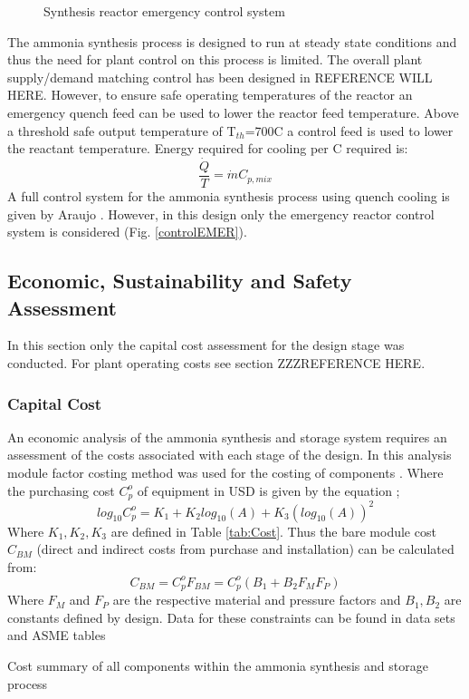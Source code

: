 \documentclass[11pt, a4paper]{article}
\begin{document}
{\begin{figure}
		\caption{Synthesis reactor emergency control system \label{fig:controlEMER}}
\end{figure}
The ammonia synthesis process is designed to run at steady state conditions and thus the need for plant control on this process is limited. The overall plant supply/demand matching control has been designed in REFERENCE WILL HERE. However, to ensure safe operating temperatures of the reactor an emergency quench feed can be used to lower the reactor feed temperature. Above a threshold safe output temperature of T$_{th}$=700\textdegree C a control feed is used to lower the reactant temperature. Energy required for cooling per \textdegree C required is:
\begin{equation}
\frac{\dot{Q}}{T} = \dot{m}C_{p,mix}
\end{equation}
A full control system for the ammonia synthesis process using quench cooling is given by Araujo \cite{Araujo2008}. However, in this design only the emergency reactor control system is considered (Fig. \ref{controlEMER}). 


\subsection{Economic, Sustainability and Safety Assessment}

In this section only the capital cost assessment for the design stage was conducted. For plant operating costs see section ZZZREFERENCE HERE.
\subsubsection{Capital Cost}
An economic analysis of the ammonia synthesis and storage system requires an assessment of the costs associated with each stage of the design. In this analysis module factor costing method was used for the costing of components \cite{RichardTurtonRichardC.BailieWallaceB.Whiting2013}. Where the purchasing cost $C_p^o$ of equipment in USD is given by the equation \cite{Banares-alcantara2014};
\begin{equation}
	log_{10}C_p^o = K_1 + K_2log_{10}(A)+K_3(log_{10}(A))^2
\end{equation}
Where $K_1,K_2,K_3$ are defined in Table \ref{tab:Cost}. Thus the bare module cost $C_{BM}$ (direct and indirect costs from purchase and installation) can be calculated from:
\begin{equation}
C_{BM} =C_p^oF_{BM} = C_p^o(B_1+B_2F_MF_P)
\end{equation}
Where $F_M$ and $F_P$ are the respective material and pressure factors and $B_1, B_2$ are constants defined by design. Data for these constraints can be found in data sets and ASME tables \cite{RichardTurtonRichardC.BailieWallaceB.Whiting2013}
\begin{table}[!htbp]
	\begin{center}
		\label{tab:Cost}
		\caption{Cost summary of all components within the ammonia synthesis and storage process}
		

\end{center}
\end{table}}
\end{document}
